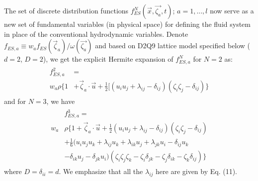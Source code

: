 \documentclass[doublecol]{epl2}
\begin{document}
The set of discrete distribution functions $f^N_{ES}(\vec{x},\vec{\zeta_a} ,t)$; $a =1,...,l$ now serve as a new set of fundamental variables (in physical space) for defining the fluid system in place of the conventional hydrodynamic variables.  Denote $f_{ES,a} \equiv w_{a} f_{ES}(\vec\zeta_a )/{\omega(\vec{\zeta_a})}$ and based on D2Q9 lattice model specified below ($d=2$, $D=2$), we get the explicit Hermite expansion of $f^N_{ES,a}$ for $N=2$ as:
\begin{align}
\begin{split}
f_{ES,a}^{2} &=  \\
w_a \rho \{ 1 &+ \vec \zeta_a \cdot \vec u + \frac{1}{2} [( u_i u_j +\lambda_{ij} -\delta_{ij})(\zeta_i \zeta_j - \delta_{ij}) \}
\end{split}
\end{align}
and for $N=3$, we have
\begin{align}
\begin{split}
&f_{ES,a}^{3} =  \\
w_a &\rho \{ 1 + \vec \zeta_a \cdot \vec u + \frac{1}{2} ( u_i u_j +\lambda_{ij} -\delta_{ij})(\zeta_i \zeta_j - \delta_{ij}) \\
&+ \frac{1}{6} (u_{i} u_{j} u_{k} + \lambda_{i j} u_{k} + \lambda_{i k} u_{j} + \lambda_{j k} u_{i} - \delta_{i j} u_{k} \\
&- \delta_{i k} u_{j} - \delta_{j k} u_{i})(\zeta _{i} \zeta _{j} \zeta _{k}-\zeta _{i}\delta_{jk} -\zeta _{j}\delta _{ik} -\zeta _{k} \delta _{ij}) \}
\end{split}
\end{align}
where $D=\delta_{ii}=d$.   We emphasize that all the $\lambda_{i j}$ here are given by Eq. (11).
\end{document}
